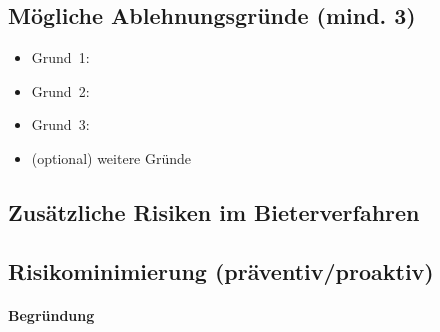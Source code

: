 \documentclass[
%
ngerman %
%
numeric %
]{wbh-assignment}
\begin{document}
\vspace*{5mm}

\subsection{Mögliche Ablehnungsgründe (mind. 3)}
\begin{itemize}
  \item Grund~1: %
  \item Grund~2: %
  \item Grund~3: %
  \item (optional) weitere Gründe
\end{itemize}

\subsection{Zusätzliche Risiken im Bieterverfahren}

\subsection{Risikominimierung (präventiv/proaktiv)}

\paragraph{Begründung}

\clearpage

\cleardoublepage

\appendix
{}
\setcounter{page}{1}

\makeatletter
\renewcommand\chapter{\@startsection{chapter}{0}{\z@}%
	{-3.5ex \@plus -1ex \@minus -.2ex}%
	{2.3ex \@plus.2ex}%
	{\normalfont\Large\bfseries}}
\makeatother
\end{document}
